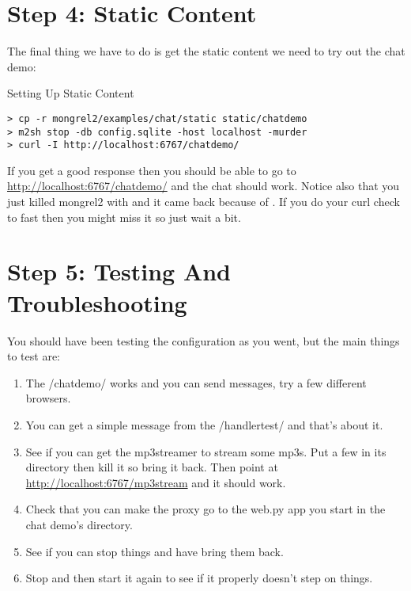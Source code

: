 \section{Step 4: Static Content}

The final thing we have to do is get the static content we need to try
out the chat demo:

\begin{code}{Setting Up Static Content}
\begin{Verbatim}
> cp -r mongrel2/examples/chat/static static/chatdemo
> m2sh stop -db config.sqlite -host localhost -murder
> curl -I http://localhost:6767/chatdemo/
\end{Verbatim}
\end{code}

If you get a good response then you should be able to go to 
\url{http://localhost:6767/chatdemo/} and the chat should work.  Notice
also that you just killed mongrel2 with  and it came back
because of .  If you do your curl check to fast then
you might miss it so just wait a bit.

\section{Step 5: Testing And Troubleshooting}

You should have been testing the configuration as you went, but the
main things to test are:

\begin{enumerate}
\item The /chatdemo/ works and you can send messages, try a few different
    browsers.
\item You can get a simple message from the /handlertest/ and that's about it.
\item See if you can get the mp3streamer to stream some mp3s.  Put a few 
    in its directory then kill it so  bring it back.  Then
    point  at \url{http://localhost:6767/mp3stream} and
    it should work.
\item Check that you can make the proxy go to the web.py app you start
    in the chat demo's directory.
\item See if you can stop things and have  bring them back.
\item Stop  and then start it again to see if it properly
    doesn't step on things.
\end{enumerate}

